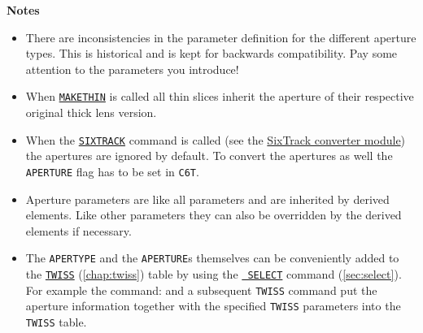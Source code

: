 {\bf Notes}
\begin{itemize}
   \item There are inconsistencies in the parameter definition for the
     different aperture types. This is historical and is kept for
     backwards compatibility. Pay some attention to the parameters you
     introduce! 


   \item When \hyperref[chap:makethin]{\tt MAKETHIN} is called all
     thin slices inherit the aperture of their respective original thick
     lens version.  

   \item When the \hyperref[chap:c6t]{\tt SIXTRACK} command is called (see the
     \hyperref[chap:sixtrack]{SixTrack converter module}) the apertures are
     ignored by default. To convert the apertures as well the {\tt APERTURE}
     flag has to be set in {\tt C6T}.  

   \item  Aperture parameters are like all parameters and are inherited
     by derived elements. Like other parameters they can also be overridden by
     the derived elements if necessary.  

   \item The {\tt APERTYPE} and the {\tt APERTURE}s themselves can be
     conveniently added to the \hyperref[chap:twiss]{\texttt{TWISS}} 
     (\autoref{chap:twiss}) table by using the \hyperref[sec:select]{\tt 
     SELECT} command (\autoref{sec:select}). For example the command:    
     and a subsequent {\tt TWISS} command put the aperture information together 
     with the specified {\tt TWISS} parameters into the {\tt TWISS} table.


\end{itemize}
